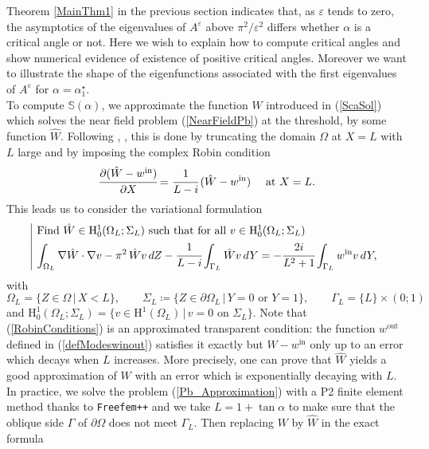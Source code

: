 \documentclass[11pt,a4paper]{article}
\newcommand{\dsp}{\displaystyle}
\newcommand{\eps}{\varepsilon}
\newcommand{\Om}{\Omega}
\newcommand{\mrm}[1]{\mathrm{#1}}
\newcommand{\mH}{\mrm{H}}
\begin{document}
Theorem \ref{MainThm1} in the previous section indicates that, as $\eps$ tends to zero, the asymptotics of the eigenvalues of $A^\eps$ above $\pi^2/\eps^2$ differs whether $\alpha$ is a critical angle or not. Here we wish to explain how to compute critical angles and show numerical evidence of existence of positive critical angles. Moreover we want to illustrate the shape of the eigenfunctions associated with the first eigenvalues of $A^\eps$ for $\alpha=\alpha^\star_1$.\\
\newline
To compute $\mathbb{S}(\alpha)$, we approximate the function $W$ introduced in (\ref{ScaSol}) which solves the near field problem (\ref{NearFieldPb}) at the threshold, by some function $\hat{W}$. Following \cite[\S6.2]{ChNa23}, \cite[\S9]{ChNa25}, this is done by truncating the domain $\Om$ at $X=L$ with $L$ large and by imposing the complex Robin condition
\begin{equation}\label{RobinConditions}
 \cfrac{\partial (\hat{W}-w^{\mrm{in}})}{\partial X}=\cfrac{1}{L-i}\,(\hat{W}-w^{\mrm{in}})\quad\mbox{ at }X= L.
\end{equation}
This leads us to consider the variational formulation
\begin{equation}\label{Pb_Approximation}
\begin{array}{|l}
\mbox{Find }\hat{W}\in\mH^1_{0}(\Om_L;\Sigma_L)\mbox{ such that for all }v\in\mH^1_{0}(\Om_L;\Sigma_L) \\[3pt]
\dsp\int_{\Om_L}\nabla \hat{W}\cdot\nabla v-\pi^2\,\hat{W} v\,dZ-\cfrac{1}{L-i}\int_{\Gamma_L} \hat{W} v\,dY=-\cfrac{2i}{L^2+1}\int_{\Gamma_L} w^{\mrm{in}} v\,dY,
\end{array}
\end{equation}
with 
\[
\Om_L=\{Z\in\Om\,|\,X<L\},\qquad \Sigma_L\coloneqq\{Z\in\partial\Om_L\,|\,Y=0\mbox{ or }Y=1\},\qquad \Gamma_L=\{L\}\times(0;1) 
\]
and $\mH^1_{0}(\Om_L;\Sigma_L)=\{v\in\mH^1(\Om_L)\,|\,v=0\mbox{ on }\Sigma_L\}$. Note that (\ref{RobinConditions}) is an approximated transparent condition: the function $w^{\mrm{out}}$ defined in (\ref{defModeswinout}) satisfies it exactly but $W-w^{\mrm{in}}$ only up to an error which decays when $L$ increases. More precisely, one can prove that $\hat{W}$ yields a good approximation of $W$ with an error which is exponentially decaying with $L$. In practice, we solve the problem (\ref{Pb_Approximation}) with a P2 finite element method thanks to \texttt{Freefem++} and we take $L=1+\tan\alpha$ to make sure that the oblique side $\Gamma$ of $\partial\Om$ does not meet $\Gamma_L$. Then replacing $W$ by $\hat{W}$ in the exact formula
\end{document}
